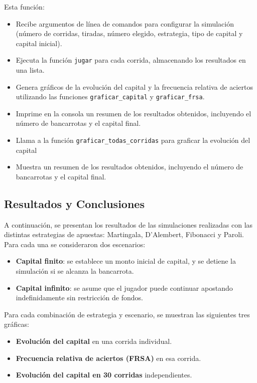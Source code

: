 \documentclass{article}
\begin{document}
Esta función:
\begin{itemize}
    \item Recibe argumentos de línea de comandos para configurar la simulación (número de corridas, tiradas, número elegido, estrategia, tipo de capital y capital inicial).
    \item Ejecuta la función \texttt{jugar} para cada corrida, almacenando los resultados en una lista.
    \item Genera gráficos de la evolución del capital y la frecuencia relativa de aciertos utilizando las funciones \texttt{graficar\_capital} y \texttt{graficar\_frsa}.
    \item Imprime en la consola un resumen de los resultados obtenidos, incluyendo el número de bancarrotas y el capital final.
    \item Llama a la función \texttt{graficar\_todas\_corridas} para graficar la evolución del capital
    \item Muestra un resumen de los resultados obtenidos, incluyendo el número de bancarrotas y el capital final.
\end{itemize}

\subsection{Resultados y Conclusiones}

A continuación, se presentan los resultados de las simulaciones realizadas con las distintas estrategias de apuestas: Martingala, D’Alembert, Fibonacci y Paroli. Para cada una se consideraron dos escenarios:

\begin{itemize}
    \item \textbf{Capital finito}: se establece un monto inicial de capital, y se detiene la simulación si se alcanza la bancarrota.
    \item \textbf{Capital infinito}: se asume que el jugador puede continuar apostando indefinidamente sin restricción de fondos.
\end{itemize}

Para cada combinación de estrategia y escenario, se muestran las siguientes tres gráficas:

\begin{itemize}
    \item \textbf{Evolución del capital} en una corrida individual.
    \item \textbf{Frecuencia relativa de aciertos (FRSA)} en esa corrida.
    \item \textbf{Evolución del capital en 30 corridas} independientes.
\end{itemize}
\end{document}
